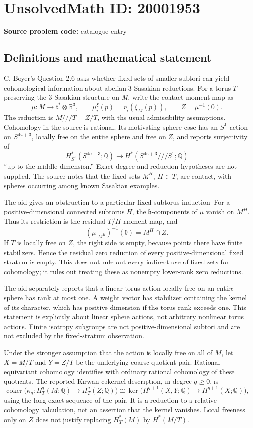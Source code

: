 \documentclass[11pt]{article}
\begin{document}
\section*{UnsolvedMath ID: 20001953}
\textbf{Source problem code:} catalogue entry
\subsection{Definitions and mathematical statement}
C. Boyer's Question 2.6 asks whether fixed sets of smaller subtori can yield cohomological information about abelian 3-Sasakian reductions. For a torus \(T\) preserving the 3-Sasakian structure on \(M\), write the contact moment map as
\[
 \mu:M\to\mathfrak t^*\otimes\mathbb R^3,\qquad
 \mu_i^\xi(p)=\eta_i(\xi_M(p)),\qquad Z=\mu^{-1}(0).
\]
The reduction is \(M\mathbin{/\!/\!/}T=Z/T\), with the usual admissibility assumptions. Cohomology in the source is rational. Its motivating sphere case has an \(S^1\)-action on \(S^{4n+3}\), locally free on the entire sphere and free on \(Z\), and reports surjectivity of
\[
 H^*_{S^1}(S^{4n+3};\mathbb Q)
 \longrightarrow H^*(S^{4n+3}\mathbin{/\!/\!/}S^1;\mathbb Q)
\]
``up to the middle dimension.'' Exact degree and reduction hypotheses are not supplied. The source notes that the fixed sets \(M^H\), \(H\subset T\), are contact, with spheres occurring among known Sasakian examples.

The aid gives an obstruction to a particular fixed-subtorus induction. For a positive-dimensional connected subtorus \(H\), the \(\mathfrak h\)-components of \(\mu\) vanish on \(M^H\). Thus its restriction is the residual \(T/H\) moment map, and
\[
 (\mu|_{M^H})^{-1}(0)=M^H\cap Z.
\]
If \(T\) is locally free on \(Z\), the right side is empty, because points there have finite stabilizers. Hence the residual zero reduction of every positive-dimensional fixed stratum is empty. This does not rule out every indirect use of fixed sets for cohomology; it rules out treating these as nonempty lower-rank zero reductions.

The aid separately reports that a linear torus action locally free on an entire sphere has rank at most one. A weight vector has stabilizer containing the kernel of its character, which has positive dimension if the torus rank exceeds one. This statement is explicitly about linear sphere actions, not arbitrary nonlinear torus actions. Finite isotropy subgroups are not positive-dimensional subtori and are not excluded by the fixed-stratum observation.

Under the stronger assumption that the action is locally free on all of \(M\), let \(X=M/T\) and \(Y=Z/T\) be the underlying coarse quotient pair. Rational equivariant cohomology identifies with ordinary rational cohomology of these quotients. The reported Kirwan cokernel description, in degree \(q\geq0\), is
\[
 \operatorname{coker}\bigl(\kappa_q:H_T^q(M;\mathbb Q)
                           \to H_T^q(Z;\mathbb Q)\bigr)
 \cong\ker\bigl(H^{q+1}(X,Y;\mathbb Q)
                         \to H^{q+1}(X;\mathbb Q)\bigr),
\]
using the long exact sequence of the pair. It is a reduction to a relative-cohomology calculation, not an assertion that the kernel vanishes. Local freeness only on \(Z\) does not justify replacing \(H_T^*(M)\) by \(H^*(M/T)\).
\end{document}
